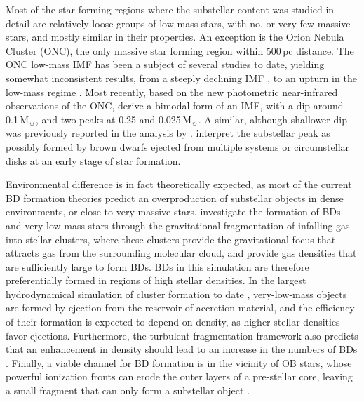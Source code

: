 \documentclass[a4paper,fleqn,usenatbib]{mnras}
\begin{document}
Most of the star forming regions where the substellar content was studied in detail are relatively loose groups of low
mass stars, with no, or very few massive stars, and mostly similar in their properties. 
An exception is the Orion Nebula Cluster (ONC), the only massive star forming region within 500\,pc distance.
The ONC low-mass IMF has been a subject of several studies to date, yielding somewhat inconsistent results, from
a steeply declining IMF \citep{dario12}, to an upturn in the low-mass regime \citet{muench02}. 
Most recently, based on the new photometric near-infrared observations of the ONC, \citet{drass16} derive a bimodal form of an IMF, 
with a dip around 0.1\,M$_{\sun}$, and two peaks at 0.25 and 0.025\,M$_{\sun}$.
A similar, although shallower dip was previously reported in the analysis by \citet{lucas05}. \citet{drass16} 
interpret the substellar peak as possibly formed by brown dwarfs ejected from multiple systems or circumstellar disks at an early stage of star 
formation.

Environmental difference is in fact theoretically expected, as
most of the current BD formation theories predict an overproduction of substellar objects in dense environments,
or close to very massive stars. \citet{bonnell08} investigate the formation of BDs and very-low-mass stars
through the gravitational fragmentation of infalling gas into stellar clusters, where these clusters provide the gravitational
focus that attracts gas from the surrounding molecular cloud, and provide gas densities that are sufficiently large to form
BDs. BDs in this simulation are therefore preferentially formed in regions of high stellar densities. In the
largest hydrodynamical simulation of cluster formation to date \citep{bate12}, very-low-mass objects are formed by ejection
from the reservoir of accretion material, and the efficiency of their formation is expected to depend on density, as higher
stellar densities favor ejections. Furthermore, the turbulent fragmentation framework also predicts that an enhancement in
density should lead to an increase in the numbers of BDs \citep{padoan02, hennebelle09}.
Finally, a viable channel for BD formation is in the vicinity of OB stars, whose powerful ionization fronts can erode
the outer layers of a pre-stellar core, leaving a small fragment that can only form a substellar object \citep{whitworth04}.
\end{document}
